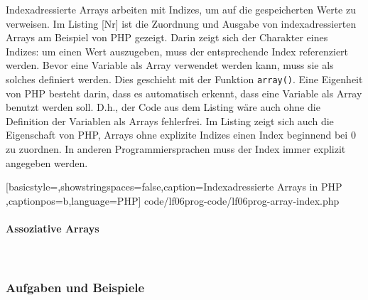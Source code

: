 Indexadressierte Arrays arbeiten mit Indizes, um auf die gespeicherten Werte zu verweisen. Im Listing [Nr] ist die Zuordnung und Ausgabe von indexadressierten Arrays am Beispiel von PHP gezeigt. Darin zeigt sich der Charakter eines Indizes: um einen Wert auszugeben, muss der entsprechende Index referenziert werden. Bevor eine Variable als Array verwendet werden kann, muss sie als solches definiert werden. Dies geschieht mit der Funktion \texttt{array()}. Eine Eigenheit von PHP besteht darin, dass es automatisch erkennt, dass eine Variable als Array benutzt werden soll. D.h., der Code aus dem Listing wäre auch ohne die Definition der Variablen als Arrays fehlerfrei. Im Listing zeigt sich auch die Eigenschaft von PHP, Arrays ohne explizite Indizes einen Index beginnend bei $0$ zu zuordnen. In anderen Programmiersprachen muss der Index immer explizit angegeben werden.


	[basicstyle=\small,showstringspaces=false,caption={Indexadressierte Arrays in PHP}
	\label{lst:array-index},captionpos=b,language=PHP]
	{code/lf06prog-code/lf06prog-array-index.php}

\paragraph{Assoziative Arrays}~\\


\subsubsection{Aufgaben und Beispiele}